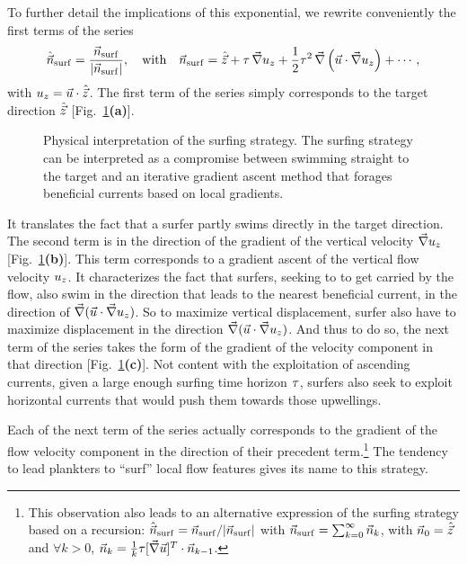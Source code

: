 To further detail the implications of this exponential, we rewrite conveniently the first terms of the series
\begin{equation}
	\hat{\vec{n}}_{\mathrm{surf}} = \frac{\vec{n}_{\mathrm{surf}}}{\lvert\vec{n}_{\mathrm{surf}}\rvert}, \quad \text{with} \quad 
	\vec{n}_{\mathrm{surf}} = \hat{\vec{z}} + \tau \, \vec{\nabla} u_z + \frac{1}{2} \tau^2 \, \vec{\nabla} \left( \vec{u} \cdot \vec{\nabla} u_z \right) + \dotsb,
\end{equation}
with $u_z = \vec{u} \cdot \hat{\vec{z}}$.
The first term of the series simply corresponds to the target direction $\hat{\vec{z}}$ [Fig.~\ref{fig:physical_interpretation}\textbf{(a)}].
\begin{figure}%
	\centering
	\def\svgwidth{\textwidth}
	
	\caption[Physical interpretation of the surfing strategy.]{
		Physical interpretation of the surfing strategy. The surfing strategy can be interpreted as a compromise between swimming straight to the target and an iterative gradient ascent method that forages beneficial currents based on local gradients.
	}
	\label{fig:physical_interpretation}
\end{figure}
It translates the fact that a surfer partly swims directly in the target direction.
The second term is in the direction of the gradient of the vertical velocity $\vec{\nabla} u_z$ [Fig.~\ref{fig:physical_interpretation}\textbf{(b)}]. 
This term corresponds to a gradient ascent of the vertical flow velocity $u_z$.
It characterizes the fact that surfers, seeking to to get carried by the flow, also swim in the direction that leads to the nearest beneficial current, in the direction of $\vec{\nabla} ( \vec{u} \cdot \vec{\nabla} u_z )$.
So to maximize vertical displacement, surfer also have to maximize displacement in the direction $\vec{\nabla} ( \vec{u} \cdot \vec{\nabla} u_z )$.
And thus to do so, the next term of the series takes the form of the gradient of the velocity component in that direction [Fig.~\ref{fig:physical_interpretation}\textbf{(c)}].
Not content with the exploitation of ascending currents, given a large enough surfing time horizon $\tau$, surfers also seek to exploit horizontal currents that would push them towards those upwellings.

Each of the next term of the series actually corresponds to the gradient of the flow velocity component in the direction of their precedent term.\footnote{This observation also leads to an alternative expression of the surfing strategy based on a recursion:
$\hat{\vec{n}}_{\mathrm{surf}} = \vec{n}_{\mathrm{surf}}/\lvert\vec{n}_{\mathrm{surf}}\rvert$ with $\vec{n}_{\mathrm{surf}} = \sum_{k = 0}^{\infty} \vec{n}_{k}$, with $\vec{n}_{0} = \hat{\vec{z}}$ and $\forall k > 0$, $\vec{n}_{k} = \frac{1}{k} \tau [ \vec{\nabla} \vec{u} ]^T \cdot \vec{n}_{k-1}$.}
The tendency to lead plankters to ``surf'' local flow features gives its name to this strategy.

